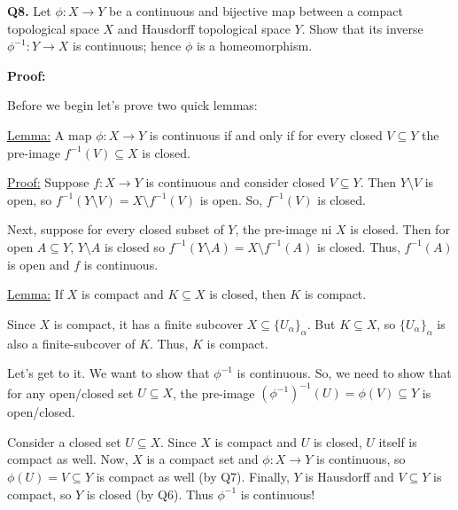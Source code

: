 \documentclass{article}
\begin{document}
\textbf{Q8.} Let $\phi : X \rightarrow Y$ be a continuous and bijective map between a compact topological space $X$ and Hausdorff topological space $Y$. Show that its inverse $\phi^{-1} : Y \rightarrow X$ is continuous; hence $\phi$ is a homeomorphism.


\vskip 0.5cm
\textbf{Proof:} 

Before we begin let's prove two quick lemmas:
\vskip 0.5cm
\begin{dottedbox}
  \underline{Lemma:} A map $\phi : X \rightarrow Y$ is continuous if and only if for every closed $V \subseteq Y$ the pre-image $f^{-1}(V) \subseteq X$ is closed.

  \vskip 0.25cm
  \underline{Proof:} Suppose $f : X \rightarrow Y$ is continuous and consider closed $V \subseteq Y$. Then $Y \setminus V$ is open, so $f^{-1}(Y \setminus V) = X \setminus f^{-1}(V)$ is open. So, $f^{-1}(V)$ is closed.

  \vskip 0.25cm
  Next, suppose for every closed subset of $Y$, the pre-image ni $X$ is closed. Then for open $A \subseteq Y$, $Y \setminus A$ is closed so $f^{-1}(Y \setminus A) = X \setminus f^{-1}(A)$ is closed. Thus, $f^{-1}(A)$ is open and $f$ is continuous.
\end{dottedbox}

\vskip 0.5cm
\begin{dottedbox}
  \underline{Lemma:} If $X$ is compact and $K \subseteq X$ is closed, then $K$ is compact.

  \vskip 0.25cm
  Since $X$ is compact, it has a finite subcover $X \subseteq \{U_{\alpha}\}_{\alpha}$. But $K \subseteq X$, so $\{U_{\alpha}\}_{\alpha}$ is also a finite-subcover of $K$. Thus, $K$ is compact.
\end{dottedbox}

\vskip 0.25cm
Let's get to it. We want to show that $\phi^{-1}$ is continuous. So, we need to show that for any open/closed set $U \subseteq X$, the pre-image $(\phi^{-1})^{-1}(U) = \phi(V) \subseteq Y$ is open/closed.

\vskip 0.25cm
Consider a closed set $U \subseteq X$. Since $X$ is compact and $U$ is closed, $U$ itself is compact as well. Now, $X$ is a compact set and $\phi: X \rightarrow Y$ is continuous, so $\phi(U) = V \subseteq Y$ is compact as well (by Q7). Finally, $Y$ is Hausdorff and $V \subseteq Y$ is compact, so $Y$ is closed (by Q6). Thus $\phi^{-1}$ is continuous!
\end{document}
